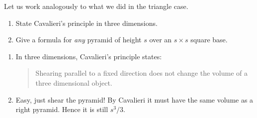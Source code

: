 \documentclass[nooutcomes,noauthor,handout]{ximera}
\begin{document}
\begin{question}
  Let us work analogously to what we did in the triangle case.
  \begin{enumerate}
  \item State Cavalieri's principle in three dimensions.
  \item Give a formula for \emph{any} pyramid of height $s$ over an $s\times
    s$ square base.
  \end{enumerate}
    \begin{freeResponse}
      \begin{enumerate}
      \item In three dimensions, Cavalieri's principle states:
        \begin{quote}
          Shearing parallel to a fixed direction does not change the
          volume of a three dimensional object.
        \end{quote}
      \item Easy, just shear the pyramid! By Cavalieri it must have
        the same volume as a right pyramid. Hence it is still $s^3/3$.
      \end{enumerate}
    \end{freeResponse}
\end{question}
\end{document}
